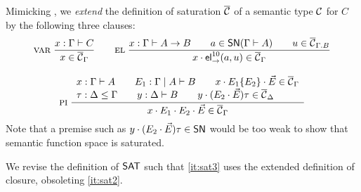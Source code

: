 Mimicking ,
we \emph{extend} the definition of saturation $\overline{\mathcal{C}}$ of a semantic type $\mathcal{C}$
for $C$ by the following three clauses:
\begin{gather*}
  \mbox{\textsc{var}}\;\dfrac{x : \Gamma \vdash C}{x \in \overline{\mathcal{C}}_\Gamma}
\qquad
  \mbox{\textsc{el}}
    \;\dfrac{x : \Gamma \vdash A \to B \qquad
      a \in \mathsf{SN}(\Gamma \vdash A) \qquad
      u \in \overline{\mathcal{C}}_{\Gamma.B}
    }{x \cdot \mathsf{el}_{\to}^{10}(a,u) \in \overline{\mathcal{C}}_\Gamma}
\\[2ex]
  \mbox{\textsc{pi}}
    \;\dfrac{\begin{array}{l}x : \Gamma \vdash A \qquad
      E_1 : \Gamma \mid A \vdash B \qquad
      x \cdot E_1\{E_2\} \cdot \vec E \in \overline{\mathcal{C}}_\Gamma \\
      \tau : \Delta \leq \Gamma \qquad
      y : \Delta \vdash B \qquad
      y \cdot (E_2 \cdot \vec E)\tau \in \overline{\mathcal{C}}_{\Delta}
    \end{array}}{x \cdot E_1 \cdot E_2 \cdot \vec E \in \overline{\mathcal{C}}_\Gamma}
\end{gather*}
Note that a premise such as $y \cdot (E_2 \cdot \vec E)\tau \in \mathsf{SN}$ would
be too weak to show that semantic function space is saturated.

We revise the definition of $\mathsf{SAT}$ such that \ref{it:sat3} uses the
extended definition of closure, obsoleting \ref{it:sat2}.


